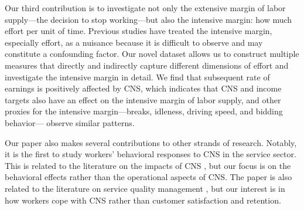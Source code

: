 \documentclass[reviewmode,AEJ]{AEA}
\begin{document}
Our third contribution is to investigate not only the extensive margin of labor supply---the decision
to stop working---but also the intensive margin: %
how much effort per unit of time. 
Previous studies have treated the intensive margin, especially effort, as a nuisance because it is 
difficult to observe and may constitute a confounding factor. 
Our novel dataset allows us to construct multiple
measures that directly and indirectly capture different dimensions of effort and investigate the intensive
margin in detail. %
We find that subsequent rate of earnings is positively affected by CNS, which indicates that CNS and income targets also have an effect on the
intensive margin of labor supply, and other proxies for the intensive margin---breaks, idleness, driving speed, and bidding behavior--- observe similar patterns.

Our paper also makes several contributions to other strands of research. Notably, it is the first to study
workers' behavioral responses to CNS in the service sector. This is related to the literature on the
impacts of CNS \citep{moore2001time,patrick2008reducing}, %
but our focus is on the behavioral effects rather than the operational aspects of CNS. 
The paper is also related to the literature on service quality management \citep{cohen2018frustration},
but our interest is in how workers cope with CNS rather than customer satisfaction and retention. 

\end{document}

